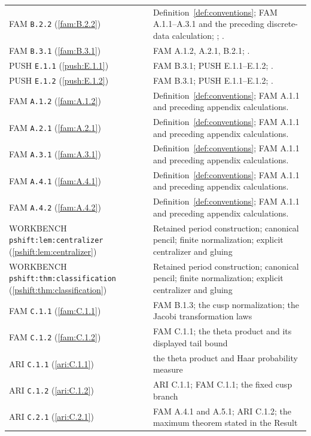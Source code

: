 \begin{longtable}{@{}L{.21\linewidth}L{.73\linewidth}@{}}
FAM \nolinkurl{B.2.2} (\ref{fam:B.2.2}) & Definition~\ref{def:conventions}; FAM A.1.1--A.3.1 and the preceding discrete-data calculation; \cite[Section 6.4]{AC26}; \cite[Sections 3 and 5]{E26}.\\
FAM \nolinkurl{B.3.1} (\ref{fam:B.3.1}) & FAM A.1.2, A.2.1, B.2.1; \cite[Proposition 4.7]{VL26}.\\
PUSH \nolinkurl{E.1.1} (\ref{push:E.1.1}) & FAM B.3.1; PUSH E.1.1--E.1.2; \cite[Section 2]{VL26}.\\
PUSH \nolinkurl{E.1.2} (\ref{push:E.1.2}) & FAM B.3.1; PUSH E.1.1--E.1.2; \cite[Section 2]{VL26}.\\
FAM \nolinkurl{A.1.2} (\ref{fam:A.1.2}) & Definition~\ref{def:conventions}; FAM A.1.1 and preceding appendix calculations.\\
FAM \nolinkurl{A.2.1} (\ref{fam:A.2.1}) & Definition~\ref{def:conventions}; FAM A.1.1 and preceding appendix calculations.\\
FAM \nolinkurl{A.3.1} (\ref{fam:A.3.1}) & Definition~\ref{def:conventions}; FAM A.1.1 and preceding appendix calculations.\\
FAM \nolinkurl{A.4.1} (\ref{fam:A.4.1}) & Definition~\ref{def:conventions}; FAM A.1.1 and preceding appendix calculations.\\
FAM \nolinkurl{A.4.2} (\ref{fam:A.4.2}) & Definition~\ref{def:conventions}; FAM A.1.1 and preceding appendix calculations.\\
WORKBENCH \nolinkurl{pshift:lem:centralizer} (\ref{pshift:lem:centralizer}) & Retained period construction; canonical pencil; finite normalization; explicit centralizer and gluing\\
WORKBENCH \nolinkurl{pshift:thm:classification} (\ref{pshift:thm:classification}) & Retained period construction; canonical pencil; finite normalization; explicit centralizer and gluing\\
FAM \nolinkurl{C.1.1} (\ref{fam:C.1.1}) & FAM B.1.3; the cusp normalization; the Jacobi transformation laws\\
FAM \nolinkurl{C.1.2} (\ref{fam:C.1.2}) & FAM C.1.1; the theta product and its displayed tail bound\\
ARI \nolinkurl{C.1.1} (\ref{ari:C.1.1}) & the theta product and Haar probability measure\\
ARI \nolinkurl{C.1.2} (\ref{ari:C.1.2}) & ARI C.1.1; FAM C.1.1; the fixed cusp branch\\
ARI \nolinkurl{C.2.1} (\ref{ari:C.2.1}) & FAM A.4.1 and A.5.1; ARI C.1.2; the maximum theorem stated in the Result\\

\end{longtable}
